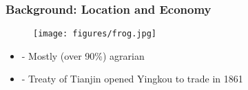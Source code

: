 
\begin{frame}[label = lnmap]
\frametitle{Background: Location and Economy \hyperlink{data}{}}
\begin{figure}
\texttt{[image: figures/frog.jpg]} \vspace*{-.5cm}\\%
{\tiny }
\end{figure}
{\tiny 
\begin{itemize}
\item - Mostly (over 90\%) agrarian
\item - Treaty of Tianjin opened Yingkou to trade in 1861
\end{itemize}
\hyperlink{outcomes}{}
\hyperlink{stylizedex}{}}
\end{frame} 





